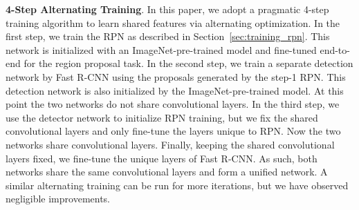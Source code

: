 \documentclass[10pt,journal,cspaper,compsoc]{IEEEtran}
\begin{document}
\vspace{.5em}
\noindent\textbf{4-Step Alternating Training}. In this paper, we adopt a pragmatic 4-step training algorithm to learn shared features via alternating optimization.
In the first step, we train the RPN as described in Section~\ref{sec:training_rpn}. This network is initialized with an ImageNet-pre-trained model and fine-tuned end-to-end for the region proposal task.
In the second step, we train a separate detection network by Fast R-CNN using the proposals generated by the step-1 RPN. This detection network is also initialized by the ImageNet-pre-trained model. At this point the two networks do not share convolutional layers. In the third step, we use the detector network to initialize RPN training, but we fix the shared convolutional layers and only fine-tune the layers unique to RPN. Now the two networks share convolutional layers. Finally, keeping the shared convolutional layers fixed, we fine-tune the unique layers of Fast R-CNN. As such, both networks share the same convolutional layers and form a unified network. A similar alternating training can be run for more iterations, but we have observed negligible improvements.
\end{document}
